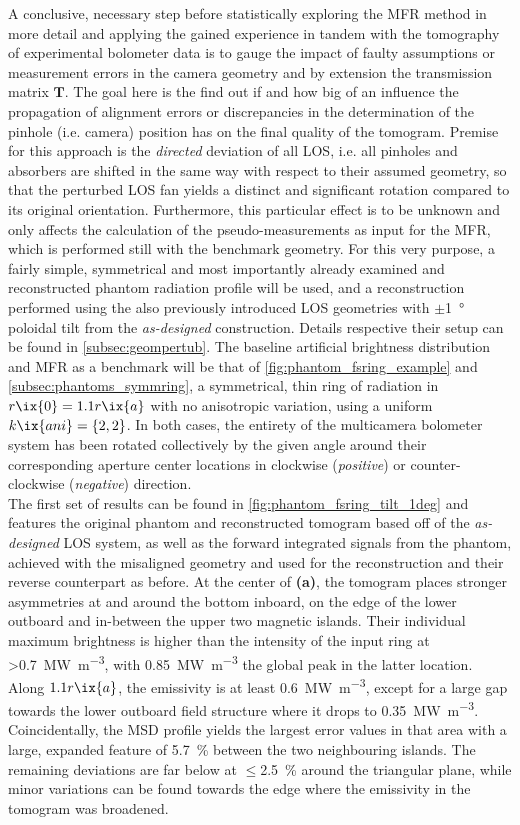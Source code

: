             A conclusive, necessary step before statistically exploring the MFR method in more detail and applying the gained experience in tandem with the tomography of experimental bolometer data is to gauge the impact of faulty assumptions or measurement errors in the camera geometry and by extension the transmission matrix $\mathbf{T}$. The goal here is the find out if and how big of an influence the propagation of alignment errors or discrepancies in the determination of the pinhole (i.e. camera) position has on the final quality of the tomogram. Premise for this approach is the \textit{directed} deviation of all LOS, i.e. all pinholes and absorbers are shifted in the same way with respect to their assumed geometry, so that the perturbed LOS fan yields a distinct and significant rotation compared to its original orientation. Furthermore, this particular effect is to be unknown and only affects the calculation of the pseudo-measurements as input for the MFR, which is performed still with the benchmark geometry. For this very purpose, a fairly simple, symmetrical and most importantly already examined and reconstructed phantom radiation profile will be used, and a reconstruction performed using the also previously introduced LOS geometries with $\pm$\SI{1}{\degree} poloidal tilt from the \textit{as-designed} construction. Details respective their setup can be found in \cref{subsec:geompertub}. The baseline artificial brightness distribution and MFR as a benchmark will be that of \cref{fig:phantom_fsring_example} and \cref{subsec:phantoms_symmring}, a symmetrical, thin ring of radiation in $r\ix{0}=1.1r\ix{a}$ with no anisotropic variation, using a uniform $k\ix{ani}=\left\{2, 2\right\}$. In both cases, the entirety of the multicamera bolometer system has been rotated collectively by the given angle around their corresponding aperture center locations in clockwise (\textit{positive}) or counter-clockwise (\textit{negative}) direction.\\%
            The first set of results can be found in \cref{fig:phantom_fsring_tilt_1deg} and features the original phantom and reconstructed tomogram based off of the \textit{as-designed} LOS system, as well as the forward integrated signals from the phantom, achieved with the misaligned geometry and used for the reconstruction and their reverse counterpart as before. At the center of \textbf{(a)}, the tomogram places stronger asymmetries at and around the bottom inboard, on the edge of the lower outboard and in-between the upper two magnetic islands. Their individual maximum brightness is higher than the intensity of the input ring at >\SI{0.7}{\mega\watt\per\cubic\meter}, with \SI{0.85}{\mega\watt\per\cubic\meter} the global peak in the latter location. Along $1.1r\ix{a}$, the emissivity is at least \SI{0.6}{\mega\watt\per\cubic\meter}, except for a large gap towards the lower outboard field structure where it drops to \SI{0.35}{\mega\watt\per\cubic\meter}. Coincidentally, the MSD profile yields the largest error values in that area with a large, expanded feature of \SI{5.7}{\percent} between the two neighbouring islands. The remaining deviations are far below at $\le$\SI{2.5}{\percent} around the triangular plane, while minor variations can be found towards the edge where the emissivity in the tomogram was broadened.\\%
